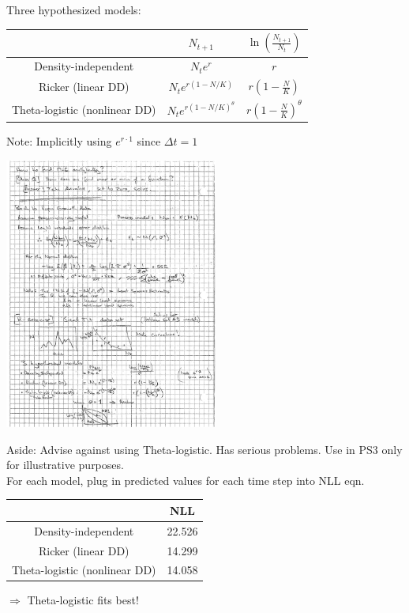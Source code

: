 \documentclass{article}
\newcommand{\note}[1]{\colorbox{gray!30}{#1}}
\newcommand{\ind}{\-\hspace{1cm}}
\begin{document}
Three hypothesized models:\\
\begin{tabular}{|c|c|c|}
\hline
   & $N_{t+1}$ & $\ln \left(\frac{N_{t+1}}{N_t} \right)$ \\ 
 \hline
Density-independent & $N_t e^r$ & $r$ \\ 
Ricker (linear DD) & $N_t e^{r(1-N/K)}$ & $r\left(1-\frac{N}{K}\right)$ \\
Theta-logistic (nonlinear DD) & $N_t e^{r(1-N/K)^\theta}$ & $r\left(1-\frac{N}{K}\right)^\theta$ \\
\hline
\end{tabular}
Note:  Implicitly using $e^{r\cdot 1}$ since $\Delta t = 1$\\
\begin{center}
	\includegraphics[width=7cm]{figs/image8.pdf}
\end{center}

\note{Aside:  Advise against using Theta-logistic.  Has serious problems.  Use in PS3 only for illustrative purposes.}\\

For each model, plug in predicted values for each time step into NLL eqn.\\

\begin{tabular}{|c|c|}
\hline
   & NLL \\ 
 \hline
Density-independent & 22.526 \\ 
Ricker (linear DD) & 14.299 \\
Theta-logistic (nonlinear DD) & 14.058 \\
\hline
\end{tabular}
\ind $\Rightarrow$ Theta-logistic fits best!\\
\end{document}
